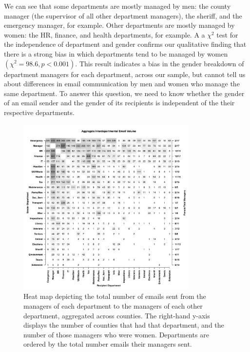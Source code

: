 \documentclass{pnastwo}
\begin{document}
\begin{article}
We can see that some departments are mostly managed by men: the county manager (the supervisor of all other department managers), the sheriff, and the emergency manager, for example. Other departments  are mostly managed by women: the HR, finance, and health departments, for example. A a $\chi^2$ test for the independence of department and gender confirms our qualitative finding that there is a strong bias in which departments tend to be managed by women $(\chi^2 = 98.6, p < 0.001)$. This result indicates a bias in the gender breakdown of department managers for each department, across our sample, but cannot tell us about differences in email communication by men and women who manage the same department. To answer this question, we need to know whether the gender of an email sender and the gender of its recipients is independent of the their respective departments. 
	
	\begin{figure}
	\centering
	\includegraphics[width = 0.8\textwidth]{images/Aggregate_Email_Flows.pdf}
	\caption{\label{fig:heatmaps}Heat map depicting the total number of emails sent from the managers of each department to the managers of each other department, aggregated across counties. The right-hand y-axis displays the number of counties that had that department, and the number of those managers who were women. Departments are ordered by the total number emails their managers sent.}
	\end{figure}

	
	

\end{article}
\end{document}
